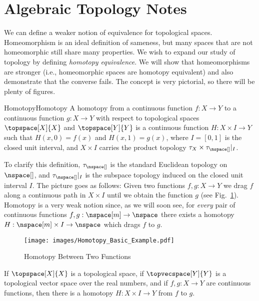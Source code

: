 \documentclass{article}                                                        %
\begin{document}
    \section{Algebraic Topology Notes}
        We can define a weaker notion of equivalence for topological spaces.
        Homeomorphism is an ideal definition of sameness, but many spaces that
        are not homeomorphic still share many properties. We wish to expand our
        study of topology by defining \textit{homotopy equivalence}. We will
        show that homeomorphisms are stronger (i.e., homeomorphic spaces are
        homotopy equivalent) and also demonstrate that the converse fails. The
        concept is very pictorial, so there will be plenty of figures.
        \begin{fdefinition}{Homotopy}{Homotopy}
            A homotopy from a continuous function $f:X\rightarrow{Y}$ to a
            continuous function $g:X\rightarrow{Y}$ with respect to topological
            spaces $\topspace[X]{X}$ and $\topspace[Y]{Y}$ is a continuous
            function $H:{X}\times{I}\rightarrow{Y}$ such that $H(x,0)=f(x)$ and
            $H(x,1)=g(x)$, where $I=[0,1]$ is the closed unit interval, and
            $X\times{I}$ carries the product topology
            $\tau_{X}\times\tau_{\nspace[]}|_{I}$.
        \end{fdefinition}
        To clarify this definition, $\tau_{\nspace[]}$ is the standard Euclidean
        topology on $\nspace[]$, and $\tau_{\nspace[]}|_{I}$ is the subspace
        topology induced on the closed unit interval $I$. The picture goes as
        follows: Given two functions $f,g:X\rightarrow{Y}$ we drag $f$ along a
        continuous path in $X\times{I}$ until we obtain the function $g$
        (see Fig.~\ref{fig:Homotopy_Diagram_for_Depicting_Homotopy}). Homotopy
        is a very weak notion since, as we will soon see, for \textit{every}
        pair of continuous functions $f,g:\nspace[m]\rightarrow\nspace$ there
        exists a homotopy $H:\nspace[m]\times{I}\rightarrow\nspace$ which drags
        $f$ to $g$.
        \begin{figure}[H]
            \centering
            \captionsetup{type=figure}
            \texttt{[image: images/Homotopy\_Basic\_Example.pdf]}
            \caption{Homotopy Between Two Functions}
            \label{fig:Homotopy_Diagram_for_Depicting_Homotopy}
        \end{figure}
        \begin{theorem}
            If $\topspace[X]{X}$ is a topological space, if $\topvecspace[Y]{Y}$
            is a topological vector space over the real numbers, and if
            $f,g:X\rightarrow{Y}$ are continuous functions, then there is a
            homotopy $H:X\times{I}\rightarrow{Y}$ from $f$ to $g$.
        \end{theorem}
\end{document}
